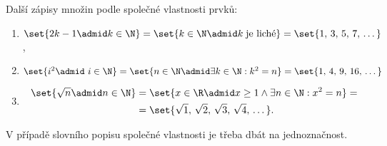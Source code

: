 \begin{example} Další zápisy množin podle společné vlastnosti prvků:
    \begin{enumerate}[label=(\roman*)]
        \item $\set{2k-1 \admid k \in \N}=\set{k\in\N \admid k\;\text{je liché}}=\set{1,\,3,\,5,\,7,\,\dots}$ ,
        \item $\set{i^2 \admid~i \in \N}=\set{n \in \N \admid \exists k\in\N: k^2=n}=\set{1,\,4,\,9,\,16,\,\dots}$
        \item 
        \begin{align*}
            \set{\sqrt{n} \admid n \in \N}&=\set{x \in \R \admid x \geq 1 \land \exists n\in\N: x^2=n}=\\
            &=\set{\sqrt{1},\,\sqrt{2},\,\sqrt{3},\,\sqrt{4},\,\dots}.
        \end{align*}
    \end{enumerate}
\end{example}
\begin{remark}
    V případě slovního popisu společné vlastnosti je třeba dbát na jednoznačnost.
\end{remark}

